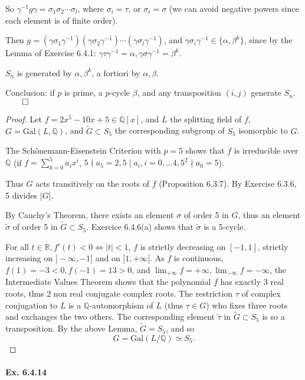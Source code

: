 \documentclass[11pt,a4paper]{article}
\newcommand{\Q}{\mathbb{Q}}
\newcommand{\R}{\mathbb{R}}
\newcommand{\Gal}{\mathrm{Gal}}
\begin{document}
So  $\gamma^{-1} g \gamma = \sigma_1 \sigma_2 \cdots \sigma_l$, where $\sigma_i = \tau$, or $\sigma_i =\sigma$ (we can avoid negative powers since each element is of finite order).

Then $g = (\gamma \sigma_1 \gamma^{-1})(\gamma \sigma_2 \gamma^{-1})\cdots(\gamma \sigma_l \gamma^{-1})$, and $\gamma \sigma_i \gamma^{-1} \in \{ \alpha, \beta^k\}$, since by the Lemma of Exercise 6.4.1: $\gamma \tau \gamma^{-1} = \alpha, \gamma \sigma \gamma^{-1} = \beta^k$.

$S_n$ is generated by $\alpha, \beta^k$, a fortiori by $\alpha, \beta$.

Conclusion: if $p$ is prime, a $p$-cycle $\beta$, and any transposition $(i,j)$ generate $S_n$.
$\qed$

\bigskip 

\begin{proof}
Let $f=2x^5-10x+5 \in \Q[x]$, and $L$ the splitting field of $f$, $G = \Gal(L,\Q)$, and $\tilde{G}\subset S_5$ the corresponding subgroup of $S_5$ isomorphic to $G$.

The  Sch\"onemann-Eisenstein Criterion with $p=5$ shows that $f$ is irreducible over $\Q$ (if  $f= \sum_{k=0}^5 a_i x^i$, $5\nmid a_5=2, 5\mid a_i, i=0,\ldots 4, 5^2\nmid a_0 = 5$).

Thus $G$ acts transitively on the roots of $f$ (Proposition 6.3.7). By Exercise 6.3.6, 5 divides $ \vert G \vert$.

By Cauchy's Theorem, there exists an element $\sigma$ of order 5 in $G$, thus an element  $\tilde{\sigma}$ of order 5 in $\tilde{G} \subset S_5$. Exercice 6.4.6(a) shows that $\tilde{\sigma}$ is a 5-cycle.

For all $t \in \R, f'(t) <  0 \iff \vert t \vert < 1$, $f$ is strictly decreasing on $[-1,1]$,  strictly increasing on $]-\infty,-1]$ and on $[1,+\infty[$. As $f$ is continuous, $f(1) = -3<0, f(-1) = 13>0$, and $\lim_{+\infty} f= +\infty, \lim_{-\infty} f= -\infty$, the Intermediate Values Theorem shows that the polynomial $f$ has exactly 3 real roots, thus 2 non real conjugate complex roots. The restriction $\tau$ of complex conjugation to $L$ is a $\Q$-automorphism of $L$ (thus $\tau \in G$) who fixes three roots and exchanges the two others. The corresponding element  $\tilde{\tau}$ in $\tilde{G} \subset S_5$ is so a transposition. By the above Lemma, $\tilde{G} = S_5$, and so $$G = \Gal(L/\Q) \simeq S_5.$$
\end{proof}

\paragraph{Ex. 6.4.14}
\end{document}
